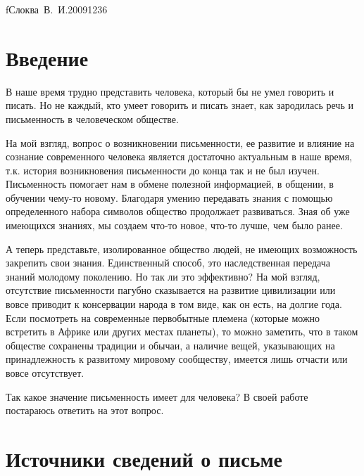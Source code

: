 

\renewcommand{\UrlFont}{\small}


    {f}{Слоква~В.~И.}{20091236}
  \onehalfspacing
  \setcounter{page}{2}
  \tableofcontents

  \newpage

  \section*{Введение}
  
В наше время трудно представить человека, который бы не умел говорить и
  писать. Но не каждый, кто умеет говорить и писать знает, как зародилась речь
  и письменность в человеческом обществе.
  
  На мой взгляд, вопрос о возникновении письменности, ее развитие и влияние на
  сознание современного человека является достаточно актуальным в наше время,
  т.к. история возникновения письменности до конца так и не был изучен.
  Письменность помогает нам в обмене полезной информацией, в общении, в
  обучении чему-то новому. Благодаря умению передавать знания с помощью
  определенного набора символов общество продолжает развиваться. Зная об уже
  имеющихся знаниях, мы создаем что-то новое, что-то лучше, чем было ранее.
  
  А теперь представьте, изолированное общество людей, не имеющих возможность
  закрепить свои знания. Единственный способ, это наследственная передача
  знаний молодому поколению. Но так ли это эффективно? На мой взгляд,
  отсутствие письменности пагубно сказывается на развитие цивилизации или вовсе
  приводит к консервации народа в том виде, как он есть, на долгие года. Если
  посмотреть на современные первобытные племена (которые можно встретить в
  Африке или других местах планеты), то можно заметить, что в таком обществе
  сохранены традиции и обычаи, а наличие вещей, указывающих на принадлежность к
  развитому мировому сообществу, имеется лишь отчасти или вовсе отсутствует.
  
  Так какое значение письменность имеет для человека? В своей работе постараюсь
  ответить на этот вопрос.
    
  \section{Источники сведений о письме}
  

